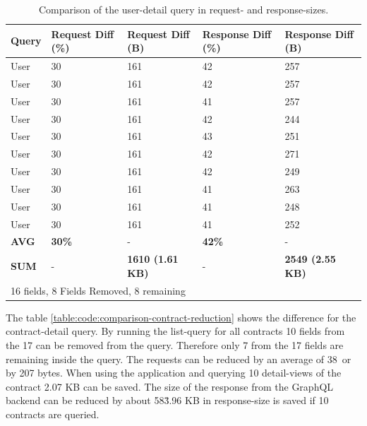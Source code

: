 \ifshowTables
\begin{table}[H]
  \begin{tabular}{|l|l|l|l|l|}
  \hline
  Query & Request Diff (\%) & Request Diff (B) & Response Diff (\%) & Response Diff (B) \\
  \hline
  User & 30\ & 161 & 42\ & 257 \\
  \hline
  User & 30\ & 161 & 42\ & 257 \\
  \hline
  User & 30\ & 161 & 41\ & 257 \\
  \hline
  User & 30\ & 161 & 42\ & 244 \\
  \hline
  User & 30\ & 161 & 43\ & 251 \\
  \hline
  User & 30\ & 161 & 42\ & 271 \\
  \hline
  User & 30\ & 161 & 42\ & 249 \\
  \hline
  User & 30\ & 161 & 41\ & 263 \\
  \hline
  User & 30\ & 161 & 41\ & 248 \\
  \hline
  User & 30\ & 161 & 41\ & 252 \\
  \hline
  \hline
  \textbf{AVG} & \textbf{30\%} & - & \textbf{42\%} & -  \\
  \hline
  \textbf{SUM} & - & \textbf{1610 (1.61 KB)} & - & \textbf{2549 (2.55 KB)} \\
  \hline
  \multicolumn{5}{l}{16 fields, 8 Fields Removed, 8 remaining}
  \end{tabular}
  \caption{Comparison of the user-detail query in request- and response-sizes.}\label{table:code:comparison-user-reduction}
\end{table}
\fi

The table \ref{table:code:comparison-contract-reduction} shows the difference for the contract-detail query. By running the list-query for all contracts 10 fields from the 17 can be removed from the query. Therefore only 7 from the 17 fields are remaining inside the query. The requests can be reduced by an average of 38\ or by 207 bytes. When using the application and querying 10 detail-views of the contract 2.07 KB can be saved. The size of the response from the GraphQL backend can be reduced by about 58\. 3.96 KB in response-size is saved if 10 contracts are queried.

